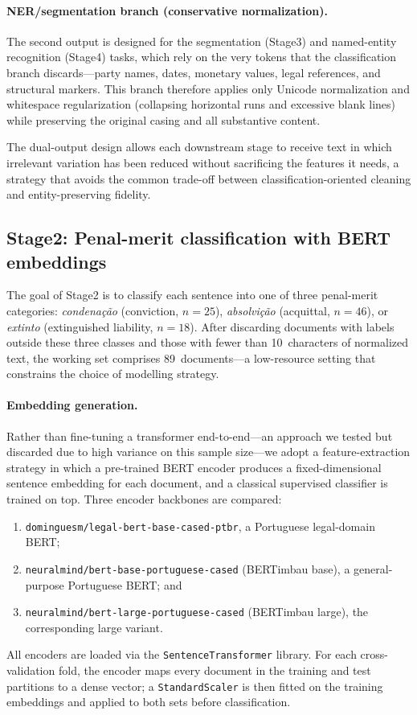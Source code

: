 \documentclass[preprint,a4paper,fleqn]{cas-dc}
\begin{document}
\paragraph{NER/segmentation branch (conservative normalization).}
The second output is designed for the segmentation (Stage3) and named-entity recognition (Stage4) tasks, which rely on the very tokens that the classification branch discards---party names, dates, monetary values, legal references, and structural markers. This branch therefore applies only Unicode normalization and whitespace regularization (collapsing horizontal runs and excessive blank lines) while preserving the original casing and all substantive content.

The dual-output design allows each downstream stage to receive text in which irrelevant variation has been reduced without sacrificing the features it needs, a strategy that avoids the common trade-off between classification-oriented cleaning and entity-preserving fidelity.

\subsection{Stage2: Penal-merit classification with BERT embeddings}
\label{subsec:stage2}

The goal of Stage2 is to classify each sentence into one of three penal-merit categories: \textit{condena\c{c}\~ao} (conviction, $n=25$), \textit{absolvi\c{c}\~ao} (acquittal, $n=46$), or \textit{extinto} (extinguished liability, $n=18$). After discarding documents with labels outside these three classes and those with fewer than 10~characters of normalized text, the working set comprises 89~documents---a low-resource setting that constrains the choice of modelling strategy.

\paragraph{Embedding generation.}
Rather than fine-tuning a transformer end-to-end---an approach we tested but discarded due to high variance on this sample size---we adopt a feature-extraction strategy in which a pre-trained BERT encoder produces a fixed-dimensional sentence embedding for each document, and a classical supervised classifier is trained on top. Three encoder backbones are compared:
\begin{enumerate}
    \item \texttt{dominguesm/legal-bert-base-cased-ptbr}, a Portuguese legal-domain BERT;
    \item \texttt{neuralmind/bert-base-portuguese-cased} (BERTimbau base), a general-purpose Portuguese BERT; and
    \item \texttt{neuralmind/bert-large-portuguese-cased} (BERTimbau large), the corresponding large variant.
\end{enumerate}
All encoders are loaded via the \texttt{SentenceTransformer} library. For each cross-validation fold, the encoder maps every document in the training and test partitions to a dense vector; a \texttt{StandardScaler} is then fitted on the training embeddings and applied to both sets before classification.
\end{document}
